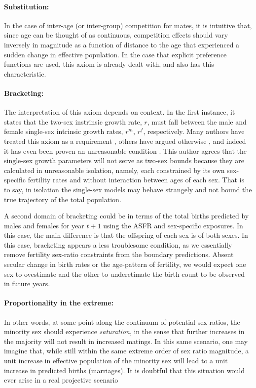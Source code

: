 \paragraph{Substitution:} In the case of inter-age (or inter-group) competition
for mates, it is intuitive that, since age can be thought of as
continuous, competition effects should vary inversely in magnitude as a function
of distance to the age that experienced a sudden change in effective
population. In the case that explicit preference functions are used, this axiom
is already dealt with, and \citet{choo2006estimating} also has this
characteristic. 

\paragraph{Bracketing:} The interpretation of this axiom depends on context.
In the first instance, it states that the two-sex instrinsic growth rate, $r$,
must fall between the male and female single-sex intrinsic growth rates, $r^m$, $r^f$, 
respectively. Many authors have treated this axiom as a requirement
\citep{pollard1948measurement,
coale1972growth, gupta1976interactive, mitra1978derivation}, others have
argued otherwise \citep{gupta1973,schoen1981harmonic}, and indeed it has even
been proven an unreasonable condition \citep{yellin1977comparison}. This author
agrees that the single-sex growth parameters will not serve as two-sex bounds
because they are calculated in unreasonable isolation, namely, each constrained
by its own sex-specific fertility rates and without interaction between ages of
each sex. That is to say, in isolation the single-sex models may behave
strangely and not bound the true trajectory of the total population.

A second domain of bracketing could be in terms of the total births predicted by
males and females for year $t+1$ using the ASFR and sex-specific exposures. In
this case, the main difference is that the offspring of each sex is of both
sexes. In this case, bracketing appears a less troublesome condition, as we
essentially remove fertility sex-ratio constraints from the boundary
predictions. Absent secular change in birth rates or the age-pattern of fertility, 
we would expect one sex to ovestimate and the other to underetimate the birth count to be observed in
future years. 

\paragraph{Proportionality in the extreme:} In other words, at some point along
the continuum of potential sex ratios, the minority sex should experience
\textit{saturation}, in the sense that further increases in the majority will
not result in increased matings. In this same scenario, one may imagine that,
while still within the same extreme order of sex ratio magnitude, a unit
increase in effective population of the minority sex will lead to a unit
increase in predicted births (marriages). It is doubtful that this
situation would ever arise in a real projective scenario 
